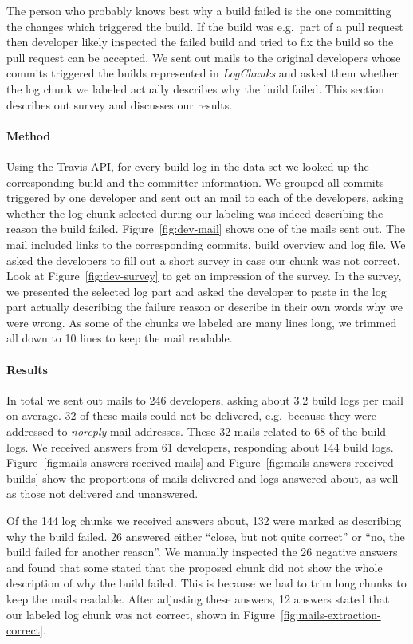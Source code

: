 \documentclass[\myrootdir/main.tex]{subfiles}
\begin{document}
The person who probably knows best why a build failed is the one committing the changes which triggered the build.
If the build was e.g.\ part of a pull request then developer likely inspected the failed build and tried to fix the build so the pull request can be accepted.
We sent out mails to the original developers whose commits triggered the builds represented in \emph{LogChunks} and asked them whether the log chunk we labeled actually describes why the build failed.
This section describes out survey and discusses our results.

\paragraph{Method}
Using the Travis API, for every build log in the data set we looked up the corresponding build and the committer information.
We grouped all commits triggered by one developer and sent out an mail to each of the developers, asking whether the log chunk selected during our labeling was indeed describing the reason the build failed.
Figure~\ref{fig:dev-mail} shows one of the mails sent out.
The mail included links to the corresponding commits, build overview and log file.
We asked the developers to fill out a short survey in case our chunk was not correct.
Look at Figure~\ref{fig:dev-survey} to get an impression of the survey.
In the survey, we presented the selected log part and asked the developer to paste in the log part actually describing the failure reason or describe in their own words why we were wrong.
As some of the chunks we labeled are many lines long, we trimmed all down to 10 lines to keep the mail readable.

\paragraph{Results}
In total we sent out mails to 246 developers, asking about 3.2 build logs per mail on average.
32 of these mails could not be delivered, e.g.\ because they were addressed to \emph{noreply} mail addresses.
These 32 mails related to 68 of the build logs.
We received answers from 61 developers, responding about 144 build logs.
Figure~\ref{fig:mails-answers-received-mails} and Figure~\ref{fig:mails-answers-received-builds} show the proportions of mails delivered and logs answered about, as well as those not delivered and unanswered.

Of the 144 log chunks we received answers about, 132 were marked as describing why the build failed.
26 answered either ``close, but not quite correct'' or ``no, the build failed for another reason''.
We manually inspected the 26 negative answers and found that some stated that the proposed chunk did not show the whole description of why the build failed.
This is because we had to trim long chunks to keep the mails readable.
After adjusting these answers, 12 answers stated that our labeled log chunk was not correct, shown in Figure~\ref{fig:mails-extraction-correct}.
\end{document}
